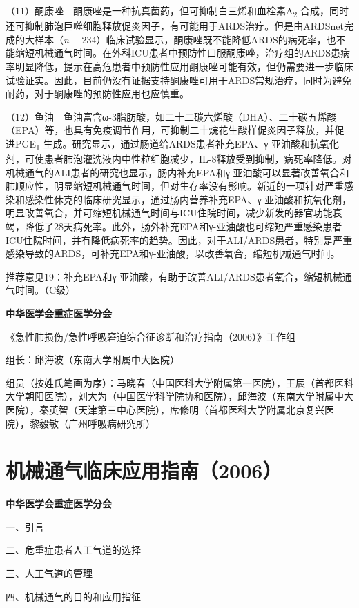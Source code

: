 （11）酮康唑　酮康唑是一种抗真菌药，但可抑制白三烯和血栓素A\textsubscript{2}
合成，同时还可抑制肺泡巨噬细胞释放促炎因子，有可能用于ARDS治疗。但是由ARDSnet完成的大样本（\emph{n}
＝234）临床试验显示，酮康唑既不能降低ARDS的病死率，也不能缩短机械通气时间。在外科ICU患者中预防性口服酮康唑，治疗组的ARDS患病率明显降低，提示在高危患者中预防性应用酮康唑可能有效，但仍需要进一步临床试验证实。因此，目前仍没有证据支持酮康唑可用于ARDS常规治疗，同时为避免耐药，对于酮康唑的预防性应用也应慎重。

（12）鱼油　鱼油富含ω-3脂肪酸，如二十二碳六烯酸（DHA）、二十碳五烯酸（EPA）等，也具有免疫调节作用，可抑制二十烷花生酸样促炎因子释放，并促进PGE\textsubscript{1}
生成。研究显示，通过肠道给ARDS患者补充EPA、γ-亚油酸和抗氧化剂，可使患者肺泡灌洗液内中性粒细胞减少，IL-8释放受到抑制，病死率降低。对机械通气的ALI患者的研究也显示，肠内补充EPA和γ-亚油酸可以显著改善氧合和肺顺应性，明显缩短机械通气时间，但对生存率没有影响。新近的一项针对严重感染和感染性休克的临床研究显示，通过肠内营养补充EPA、γ-亚油酸和抗氧化剂，明显改善氧合，并可缩短机械通气时间与ICU住院时间，减少新发的器官功能衰竭，降低了28天病死率。此外，肠外补充EPA和γ-亚油酸也可缩短严重感染患者ICU住院时间，并有降低病死率的趋势。因此，对于ALI/ARDS患者，特别是严重感染导致的ARDS，可补充EPA和γ-亚油酸，以改善氧合，缩短机械通气时间。

推荐意见19：补充EPA和γ-亚油酸，有助于改善ALI/ARDS患者氧合，缩短机械通气时间。（C级）

\textbf{中华医学会重症医学分会}

《急性肺损伤/急性呼吸窘迫综合征诊断和治疗指南（2006）》工作组

组长：邱海波（东南大学附属中大医院）

组员（按姓氏笔画为序）：马晓春（中国医科大学附属第一医院），王辰（首都医科大学朝阳医院），刘大为（中国医学科学院协和医院），邱海波（东南大学附属中大医院），秦英智（天津第三中心医院），席修明（首都医科大学附属北京复兴医院），黎毅敏（广州呼吸病研究所）

\protect\hypertarget{text00035.html}{}{}

\chapter{机械通气临床应用指南（2006）}

\textbf{中华医学会重症医学分会}

一、引言

二、危重症患者人工气道的选择

三、人工气道的管理

四、机械通气的目的和应用指征

